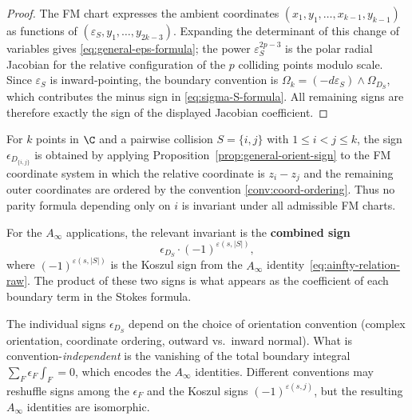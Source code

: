 \begin{proof}
The FM chart expresses the ambient coordinates
$(x_1,y_1,\ldots,x_{k-1},y_{k-1})$ as functions of
$(\varepsilon_S,y_1,\ldots,y_{2k-3})$. Expanding the determinant of this
change of variables gives \eqref{eq:general-eps-formula}; the power
$\varepsilon_S^{2p-3}$ is the polar radial Jacobian for the relative
configuration of the $p$ colliding points modulo scale. Since
$\varepsilon_S$ is inward-pointing, the boundary convention is
$\Omega_k=(-d\varepsilon_S)\wedge\Omega_{D_S}$, which contributes the
minus sign in \eqref{eq:sigma-S-formula}. All remaining signs are
therefore exactly the sign of the displayed Jacobian coefficient.
\end{proof}

\begin{corollary}
For $k$ points in $\C$ and a pairwise collision
$S=\{i,j\}$ with $1\le i<j\le k$, the sign
$\epsilon_{D_{\{i,j\}}}$ is obtained by applying
Proposition~\ref{prop:general-orient-sign} to the FM coordinate
system in which the relative coordinate is $z_i-z_j$ and the remaining
outer coordinates are ordered by the convention
\ref{conv:coord-ordering}. Thus no parity formula depending only on
$i$ is invariant under all admissible FM charts.

For the $A_\infty$ applications, the relevant invariant is the
\textbf{combined sign}
\[
\epsilon_{D_S}\cdot(-1)^{\varepsilon(s,|S|)},
\]
where $(-1)^{\varepsilon(s,|S|)}$ is the Koszul sign from the $A_\infty$ identity~\eqref{eq:ainfty-relation-raw}. The product of these two signs is what appears as the coefficient of each boundary term in the Stokes formula.
\end{corollary}

\begin{remark}
The individual signs $\epsilon_{D_S}$ depend on the choice of orientation convention (complex orientation, coordinate ordering, outward vs.\ inward normal). What is convention-\emph{independent} is the vanishing of the total boundary integral $\sum_F \epsilon_F\int_F = 0$, which encodes the $A_\infty$ identities. Different conventions may reshuffle signs among the $\epsilon_F$ and the Koszul signs $(-1)^{\varepsilon(s,j)}$, but the resulting $A_\infty$ identities are isomorphic.
\end{remark}
